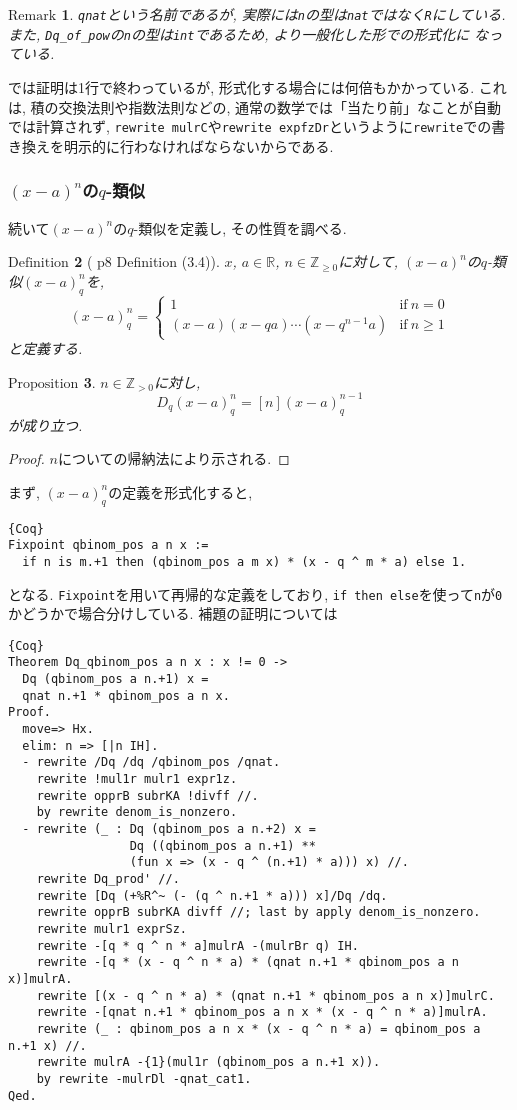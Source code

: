 \documentclass[11pt]{jarticle}
\theoremstyle{mystyle}
\newtheorem{df}{$\textrm{Definition}$}[subsubsection]
\newtheorem{prop}[df]{$\textrm{Proposition}$}
\newtheorem{rmk}[df]{$\textrm{Remark}$}
\newcommand{\bdf}{\begin{shadebox} \begin{df}}
\newcommand{\edf}{\end{df} \end{shadebox}}
\newcommand{\bprop}{\begin{shadebox} \begin{prop}}
\newcommand{\eprop}{\end{prop} \end{shadebox}}
\newcommand{\brmk}{\begin{rmk}}
\newcommand{\ermk}{\end{rmk}}
\newcommand{\bpf}{\begin{proof}}
\newcommand{\epf}{\end{proof}}
\newcommand{\Z}{\mathbb{Z}}
\newcommand{\R}{\mathbb{R}}
\newcommand{\0}{\textbf{0}}
\newcommand{\1}{\textbf{1}}
\newcommand{\2}{\textbf{2}}
\begin{document}
\brmk
  {\tt qnat}という名前であるが, 実際には{\tt n}の型は{\tt nat}ではなく{\tt R}にしている. 
  また, {\tt Dq\_of\_pow}の{\tt n}の型は{\tt int}であるため, より一般化した形での形式化に
  なっている. 
\ermk
\cite{Kac}では証明は1行で終わっているが, 形式化する場合には何倍もかかっている. これは, 積の交換法則や指数法則などの, 通常の数学では「当たり前」なことが自動では計算されず, {\tt rewrite mulrC}や{\tt rewrite expfzDr}というように{\tt rewrite}での書き換えを明示的に行わなければならないからである. \\
\subsubsection{$(x - a)^n$の$q$-類似}
続いて$(x - a)^n$の$q$-類似を定義し, その性質を調べる.  
\bdf[\cite{Kac} p8 Definition (3.4)]
  $x$, $a \in \R$, $n \in \Z_{\ge 0}$に対して, $(x - a)^n$の$q$-類似$(x - a)^n_q$を, 
  \[
  (x - a)^n_q = \begin{cases}
                      1 & \text{if}\ n = 0 \\
                      (x - a) (x - qa) \cdots (x - q^{n - 1} a) & \text{if}\ n \ge 1
                    \end{cases}
  \]
  と定義する. 
\edf
\bprop \label{Dq_qbinom_nonneg}
  $n\in\Z_{>0}$に対し, 
  \[
    D_q(x-a)^n_q = [n](x-a)^{n-1}_q
  \]
  が成り立つ. 
\eprop
\bpf
  $n$についての帰納法により示される. 
\epf
まず, $(x - a)^n_q$の定義を形式化すると, 
\begin{lstlisting}{Coq}
Fixpoint qbinom_pos a n x :=
  if n is m.+1 then (qbinom_pos a m x) * (x - q ^ m * a) else 1. \end{lstlisting}
となる. {\tt Fixpoint}を用いて再帰的な定義をしており, {\tt if then else}を使って{\tt n}が{\tt 0}かどうかで場合分けしている. 補題の証明については 
\begin{lstlisting}{Coq}
Theorem Dq_qbinom_pos a n x : x != 0 ->
  Dq (qbinom_pos a n.+1) x =
  qnat n.+1 * qbinom_pos a n x.
Proof.
  move=> Hx.
  elim: n => [|n IH].
  - rewrite /Dq /dq /qbinom_pos /qnat.
    rewrite !mul1r mulr1 expr1z.
    rewrite opprB subrKA !divff //.
    by rewrite denom_is_nonzero.
  - rewrite (_ : Dq (qbinom_pos a n.+2) x =
                 Dq ((qbinom_pos a n.+1) **
                 (fun x => (x - q ^ (n.+1) * a))) x) //.
    rewrite Dq_prod' //.
    rewrite [Dq (+%R^~ (- (q ^ n.+1 * a))) x]/Dq /dq.
    rewrite opprB subrKA divff //; last by apply denom_is_nonzero.
    rewrite mulr1 exprSz.
    rewrite -[q * q ^ n * a]mulrA -(mulrBr q) IH.
    rewrite -[q * (x - q ^ n * a) * (qnat n.+1 * qbinom_pos a n x)]mulrA.
    rewrite [(x - q ^ n * a) * (qnat n.+1 * qbinom_pos a n x)]mulrC.
    rewrite -[qnat n.+1 * qbinom_pos a n x * (x - q ^ n * a)]mulrA.
    rewrite (_ : qbinom_pos a n x * (x - q ^ n * a) = qbinom_pos a n.+1 x) //.
    rewrite mulrA -{1}(mul1r (qbinom_pos a n.+1 x)).
    by rewrite -mulrDl -qnat_cat1.
Qed.
\end{lstlisting}
\end{document}

